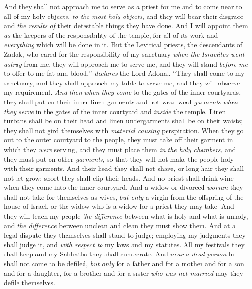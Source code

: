 \begin{biblechapter}
\verse And they shall not approach me to serve as \textit{a} priest for me and to come near to all of my holy objects, \textit{to the most holy objects},  and they will bear their disgrace and \textit{the results of} their detestable things they have done.
\verse And I will appoint them \textit{as} the keepers of the responsibility of the temple, for all of its work and \textit{everything} which will be done in it.
\verse But the Levitical priests, the descendants of Zadok, who cared for the responsibility of my sanctuary \textit{when the Israelites went astray} from me, they will approach me to serve me, and they will stand \textit{before me} to offer to me fat and blood,” \textit{declares} the Lord Adonai.
\verse “They shall come to my sanctuary, and they shall approach my table to serve me, and they will observe my requirement.
\verse \textit{And then} \textit{when they come} to the gates of the inner courtyards, they shall put on their inner linen garments and not wear wool \textit{garments} \textit{when they serve} in the gates of the inner courtyard and \textit{inside} the temple.
\verse Linen turbans shall be on their head and linen undergarments shall be on their waists; they shall not gird themselves with \textit{material causing} perspiration.
\verse When they go out to the outer courtyard to the people, they must take off their garment in which they \textit{were} serving, and they must place them \textit{in the holy chambers}, and they must put on other \textit{garments}, so that they will not make the people holy with their garments.
\verse And their head they shall not shave, or long hair they shall not let grow; short they shall clip their heads.
\verse And no priest shall drink wine when they come into the inner courtyard.
\verse And a widow or divorced \textit{woman} they shall not take for themselves as wives, \textit{but only} a virgin from the offspring of the house of Israel, or the widow who is a widow for a priest they may take.
\verse And they will teach my people \textit{the difference} between what is holy and what is unholy, and \textit{the difference} between unclean and clean they must show them.
\verse And at a legal dispute they themselves shall stand to judge; employing my judgments they shall judge it, and \textit{with respect to} my laws and my statutes. All my festivals they shall keep and my Sabbaths they shall consecrate.
\verse And \textit{near a dead person} he shall not come to be defiled, \textit{but only} for a father and for a mother and for a son and for a daughter, for a brother and for a sister \textit{who was not married} may they defile themselves.

\end{biblechapter}
